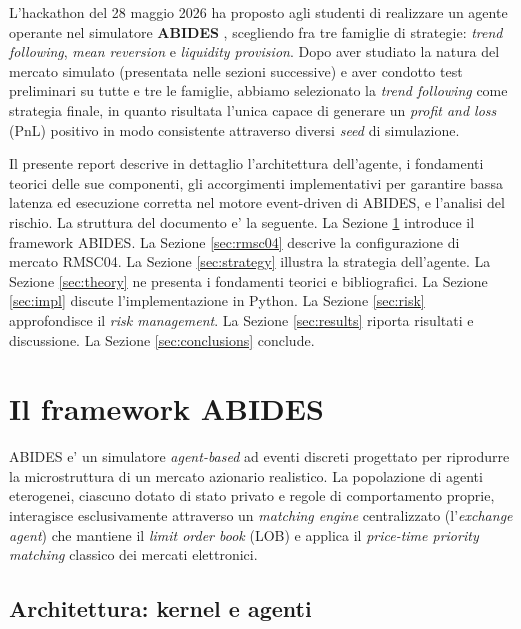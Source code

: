 \documentclass[11pt,a4paper]{article}
\begin{document}
L'hackathon del 28 maggio 2026 ha proposto agli studenti di
realizzare un agente operante nel simulatore \textbf{ABIDES}
\cite{byrd2020abides}, scegliendo fra tre famiglie di strategie:
\emph{trend following}, \emph{mean reversion} e \emph{liquidity
provision}.  Dopo aver studiato la natura del mercato simulato
(presentata nelle sezioni successive) e aver condotto test
preliminari su tutte e tre le famiglie, abbiamo selezionato la
\emph{trend following} come strategia finale, in quanto risultata
l'unica capace di generare un \emph{profit and loss} (PnL) positivo
in modo consistente attraverso diversi \emph{seed} di simulazione.

Il presente report descrive in dettaglio l'architettura
dell'agente, i fondamenti teorici delle sue componenti, gli
accorgimenti implementativi per garantire bassa latenza ed
esecuzione corretta nel motore event-driven di ABIDES, e l'analisi
del rischio.  La struttura del documento e' la seguente.  La
Sezione \ref{sec:abides} introduce il framework ABIDES.  La
Sezione \ref{sec:rmsc04} descrive la configurazione di mercato
RMSC04.  La Sezione \ref{sec:strategy} illustra la strategia
dell'agente.  La Sezione \ref{sec:theory} ne presenta i fondamenti
teorici e bibliografici.  La Sezione \ref{sec:impl} discute
l'implementazione in Python.  La Sezione \ref{sec:risk} approfondisce
il \emph{risk management}.  La Sezione \ref{sec:results} riporta
risultati e discussione.  La Sezione \ref{sec:conclusions} conclude.

\section{Il framework ABIDES}
\label{sec:abides}

ABIDES \cite{byrd2020abides} e' un simulatore \emph{agent-based} ad
eventi discreti progettato per riprodurre la microstruttura di un
mercato azionario realistico.  La popolazione di agenti eterogenei,
ciascuno dotato di stato privato e regole di comportamento proprie,
interagisce esclusivamente attraverso un \emph{matching engine}
centralizzato (l'\emph{exchange agent}) che mantiene il \emph{limit
order book} (LOB) e applica il \emph{price-time priority matching}
classico dei mercati elettronici.

\subsection{Architettura: kernel e agenti}
\end{document}
